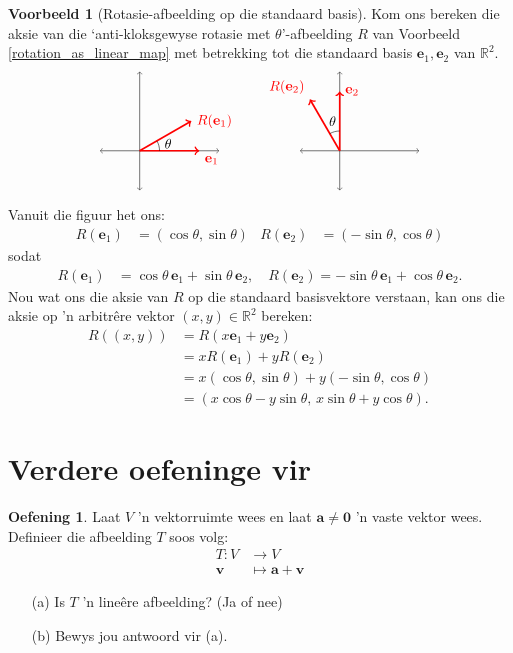 \documentclass[a4paper,11pt]{book}
\theoremstyle{definition}
\newtheorem{exercise}{Oefening}
\newtheorem{example_environment}{Voorbeeld}[chapter]
\newcommand{\ve}[1]{\mathbf{#1}}
\newcommand{\furtherexercises}{\section*{Verdere oefeninge vir
\thesection}}
\newenvironment{example}
	{
		\begin{oframed}
		\begin{example_environment}
	}
	{
		\end{example_environment}
		\end{oframed}
	}
\begin{document}
\begin{example}[Rotasie-afbeelding op die standaard
	basis]\label{rotation-map-example-complete} Kom ons bereken
	die aksie van die `anti-kloksgewyse rotasie met $\theta$'-afbeelding
	$R$ van Voorbeeld \ref{rotation_as_linear_map} met betrekking tot die
	standaard basis $\ve{e}_1, \ve{e}_2$ van $\mathbb{R}^2$. 
\begin{align*}
\begin{tikzpicture}
\draw[<->] (-1, 0) -- (2, 0);
\draw[<->] (0, -1) -- (0, 2);
\draw[very thick, red, ->] (0, 0) -- (1.5, 0) node[below right] {$\ve{e}_1$};
\draw[very thick, red, ->] (0,0) -- (30:1.5) node[right] {$R(\ve{e}_1)$};
\draw (0:0.5) arc (0:30:0.5) node[right, xshift=2pt, yshift=-2pt] {$\theta$};
\end{tikzpicture}
\qquad
\begin{tikzpicture}
\draw[<->] (-1, 0) -- (2, 0);
\draw[<->] (0, -1) -- (0, 2);
\draw[very thick, red, ->] (0, 0) -- (0, 1.5) node[right] {$\ve{e}_2$};
\draw[very thick, red, ->] (0,0) -- (120:1.5) node[above left] {$R(\ve{e}_2)$};
\draw (90:0.5) arc (90:120:0.5) node[above, xshift=2pt, yshift=2pt] {$\theta$} ;
\end{tikzpicture}
\end{align*}
	Vanuit die figuur het ons:
	\begin{align*}
		R(\ve{e}_1) &= (\cos \theta, \sin \theta) & R(\ve{e}_2) &= (-\sin
		\theta, \cos \theta) 
	\end{align*}
	sodat
	\begin{align*}
		R(\ve{e}_1) &=  \cos \theta \, \ve{e}_1 + \sin \theta\, \ve{e}_2,
		\quad R(\ve{e}_2) = -\sin \theta \, \ve{e}_1 +  \cos \theta\,
		\ve{e}_2.
	\end{align*}
	Nou wat ons die aksie van $R$ op die standaard basisvektore verstaan,
	kan ons die aksie op 'n arbitr{\^e}re vektor $(x, y) \in \mathbb{R}^2$
	bereken:
	\begin{align*}
		R\left( (x,y)\right) &= R( x \ve{e}_1 + y \ve{e}_2 ) \\
		&= x R(\ve{e}_1) + y R(\ve{e}_2) \\
		&= x (\cos \theta, \sin \theta) + y (-\sin \theta, \cos \theta) \\
		&= (x \cos \theta - y \sin \theta, \, x \sin \theta + y \cos
		\theta).
	\end{align*}
\end{example}


\furtherexercises
\begin{exercise} Laat $V$ 'n vektorruimte wees en laat $\ve{a} \neq \ve{0}$
	'n vaste vektor wees. Definieer die afbeelding $T$ soos volg:
	\begin{align*}
		T : V &\rightarrow V \\
		\ve{v} & \mapsto \ve{a} + \ve{v} 
	\end{align*}
	\begin{itemize}
		\item[(a)] Is $T$ 'n line{\^e}re afbeelding? (Ja of nee)
		\item[(b)] Bewys jou antwoord vir (a).
	\end{itemize}
\end{exercise}
\end{document}

